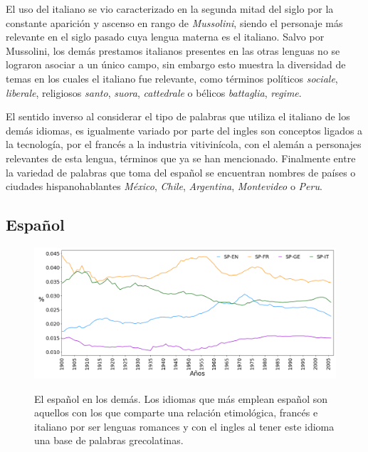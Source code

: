 \clearpage


El uso del italiano se vio caracterizado en la segunda mitad del siglo por la constante aparición y ascenso en rango de \textit{Mussolini}, siendo el personaje más relevante en el siglo pasado cuya lengua materna es el italiano.  Salvo por Mussolini, los demás prestamos italianos presentes en las otras lenguas no se lograron asociar a un único campo, sin embargo esto muestra la diversidad de temas en los cuales el italiano fue relevante, como términos políticos \textit{sociale}, \textit{liberale}, religiosos \textit{santo}, \textit{suora}, \textit{cattedrale} o  bélicos \textit{battaglia}, \textit{regime}.

El sentido inverso al considerar el tipo de palabras que utiliza el italiano de los demás idiomas, es igualmente variado por parte del ingles son conceptos ligados a la tecnología, por el francés a la industria vitivinícola, con el alemán a personajes relevantes de esta lengua,  términos que ya se han mencionado. Finalmente entre la variedad de palabras que toma del español se encuentran nombres de países o ciudades hispanohablantes \textit{México}, \textit{Chile}, \textit{Argentina}, \textit{Montevideo} o \textit{Peru}. 

\clearpage
\subsection{Español}

\begin{figure}[h!]
	\centering
	\includegraphics[scale=.36]{Cap_4/PF1_S2_SP.png}
	\label{fig.ST_a_SP}
	\caption{El español en los demás. Los idiomas que más emplean español son aquellos con los que comparte una relación etimológica, francés e italiano por ser lenguas romances y con el ingles al tener este idioma una base de palabras grecolatinas.     }
\end{figure}
		
